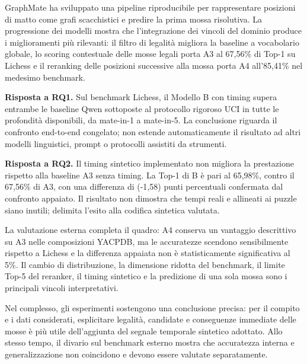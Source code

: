 \label{chap:conclusions}

GraphMate ha sviluppato una pipeline riproducibile per rappresentare posizioni di
matto come grafi scacchistici e predire la prima mossa risolutiva. La progressione
dei modelli mostra che l'integrazione dei vincoli del dominio produce i miglioramenti
più rilevanti: il filtro di legalità migliora la baseline a vocabolario globale, lo
scoring contestuale delle mosse legali porta A3 al 67,56\% di Top-1 su Lichess e il
reranking delle posizioni successive alla mossa porta A4 all'85,41\% nel medesimo
benchmark.

\textbf{Risposta a RQ1.} Sul benchmark Lichess, il Modello B con timing supera
entrambe le baseline Qwen sottoposte al protocollo rigoroso UCI in tutte le
profondità disponibili, da mate-in-1 a mate-in-5. La conclusione riguarda il
confronto end-to-end congelato; non estende automaticamente il risultato ad altri
modelli linguistici, prompt o protocolli assistiti da strumenti.

\textbf{Risposta a RQ2.} Il timing sintetico implementato non migliora la
prestazione rispetto alla baseline A3 senza timing. La Top-1 di B è pari al
65,98\%, contro il 67,56\% di A3, con una differenza di (-1{,}58) punti
percentuali confermata dal confronto appaiato. Il risultato non dimostra che tempi
reali e allineati ai puzzle siano inutili; delimita l'esito alla codifica sintetica
valutata.

La valutazione esterna completa il quadro: A4 conserva un vantaggio descrittivo su
A3 nelle composizioni YACPDB, ma le accuratezze scendono sensibilmente rispetto a
Lichess e la differenza appaiata non è statisticamente significativa al 5\%. Il
cambio di distribuzione, la dimensione ridotta del benchmark, il limite Top-5 del
reranker, il timing sintetico e la predizione di una sola mossa sono i principali
vincoli interpretativi.

Nel complesso, gli esperimenti sostengono una conclusione precisa: per il compito e
i dati considerati, esplicitare legalità, candidate e conseguenze immediate delle
mosse è più utile dell'aggiunta del segnale temporale sintetico adottato. Allo
stesso tempo, il divario sul benchmark esterno mostra che accuratezza interna e
generalizzazione non coincidono e devono essere valutate separatamente.
